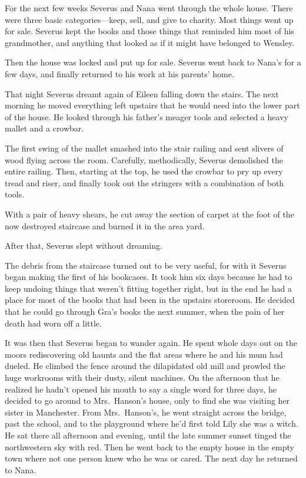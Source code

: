 For the next few weeks Severus and Nana went through the whole house. There were three basic categories—keep, sell, and give to charity. Most things went up for sale. Severus kept the books and those things that reminded him most of his grandmother, and anything that looked as if it might have belonged to Wensley.

Then the house was locked and put up for sale. Severus went back to Nana's for a few days, and finally returned to his work at his parents' home.

That night Severus dreamt again of Eileen falling down the stairs. The next morning he moved everything left upstairs that he would need into the lower part of the house. He looked through his father's meager tools and selected a heavy mallet and a crowbar.

The first swing of the mallet smashed into the stair railing and sent slivers of wood flying across the room. Carefully, methodically, Severus demolished the entire railing. Then, starting at the top, he used the crowbar to pry up every tread and riser, and finally took out the stringers with a combination of both tools.

With a pair of heavy shears, he cut away the section of carpet at the foot of the now destroyed staircase and burned it in the area yard.

After that, Severus slept without dreaming.

The debris from the staircase turned out to be very useful, for with it Severus began making the first of his bookcases. It took him six days because he had to keep undoing things that weren't fitting together right, but in the end he had a place for most of the books that had been in the upstairs storeroom. He decided that he could go through Gra's books the next summer, when the pain of her death had worn off a little.

It was then that Severus began to wander again. He spent whole days out on the moors rediscovering old haunts and the flat areas where he and his mum had dueled. He climbed the fence around the dilapidated old mill and prowled the huge workrooms with their dusty, silent machines. On the afternoon that he realized he hadn't opened his mouth to say a single word for three days, he decided to go around to Mrs.~Hanson's house, only to find she was visiting her sister in Manchester. From Mrs.~Hanson's, he went straight across the bridge, past the school, and to the playground where he'd first told Lily she was a witch. He sat there all afternoon and evening, until the late summer sunset tinged the northwestern sky with red. Then he went back to the empty house in the empty town where not one person knew who he was or cared. The next day he returned to Nana.


